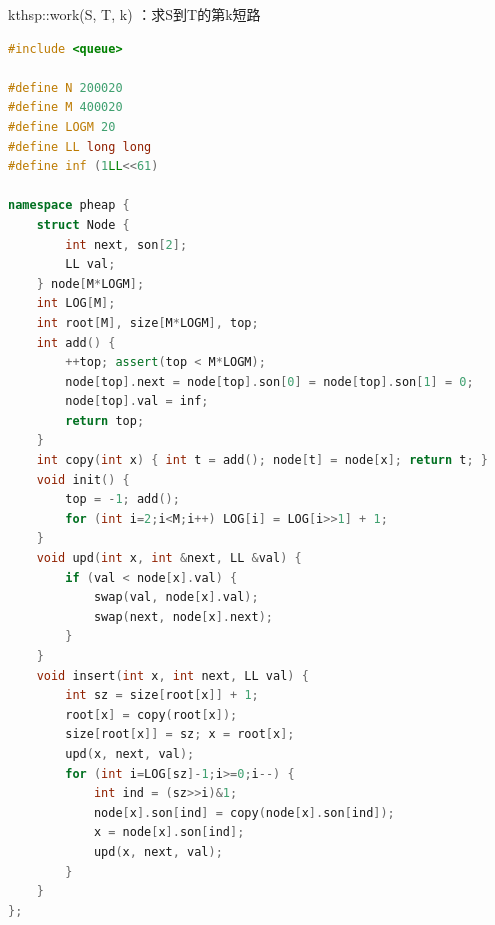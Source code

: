 \documentclass{article}
\begin{document}
kthsp::work(S, T, k) ：求S到T的第k短路
\begin{lstlisting}[language=C++]
#include <queue>
 
#define N 200020
#define M 400020
#define LOGM 20
#define LL long long
#define inf (1LL<<61)

namespace pheap {
	struct Node {
		int next, son[2];
		LL val;
	} node[M*LOGM];
	int LOG[M];
	int root[M], size[M*LOGM], top;
	int add() {
		++top; assert(top < M*LOGM);
		node[top].next = node[top].son[0] = node[top].son[1] = 0;
		node[top].val = inf;
		return top;
	}
	int copy(int x) { int t = add(); node[t] = node[x]; return t; }
	void init() {
		top = -1; add();
		for (int i=2;i<M;i++) LOG[i] = LOG[i>>1] + 1;
	}
	void upd(int x, int &next, LL &val) {
		if (val < node[x].val) {
			swap(val, node[x].val);
			swap(next, node[x].next);
		}
	}
	void insert(int x, int next, LL val) {
		int sz = size[root[x]] + 1;
		root[x] = copy(root[x]);
		size[root[x]] = sz; x = root[x];
		upd(x, next, val);
		for (int i=LOG[sz]-1;i>=0;i--) {
			int ind = (sz>>i)&1;
			node[x].son[ind] = copy(node[x].son[ind]);
			x = node[x].son[ind];
			upd(x, next, val);
		}
	}
};
 

\end{lstlisting}
\end{document}
